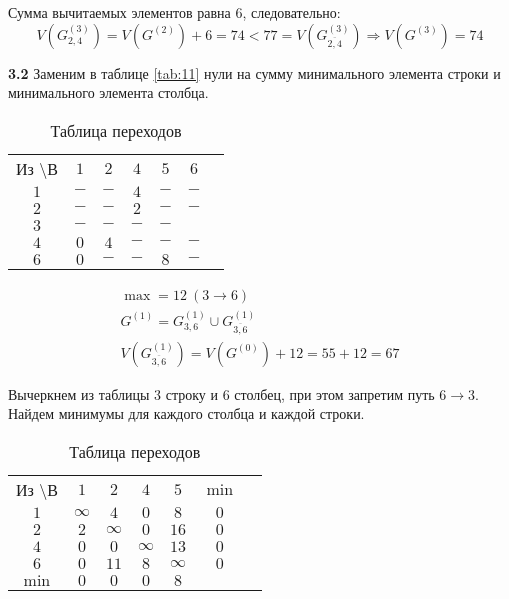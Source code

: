 Сумма вычитаемых элементов равна $6$, следовательно:
\begin{equation*}
V(G_{2,4}^{(3)}) = V(G^{(2)}) + 6 = 74 < 77 = V(G_{\overline{2,4}}^{(3)}) \Rightarrow V(G^{(3)}) = 74
\end{equation*}


\textbf{3.2} Заменим в таблице \ref{tab:11} нули на сумму минимального элемента строки и минимального элемента столбца.

\begin{table}[H]
\begin{center}
	\def\tabcolsep{15pt}
	\caption{Таблица переходов}
	\label{tab:8}
	\begin{tabular}{|c||c|c|c|c|c|c|}
		\hline
		Из \textbackslash В & $1$ & $2$ & $4$ & $5$ & $6$ \\
		\hhline{|=#=|=|=|=|=|}
		$1$ & $-$ & $-$ & $4$ & $-$ & $-$ \\
		\hline
		$2$ & $-$ & $-$ & $2$ & $-$ & $-$ \\
		\hline
		$3$ & $-$ & $-$ & $-$ & $-$ & \redbold{$12$} \\ 
		\hline
		$4$ & $0$ & $4$ & $-$ & $-$ & $-$ \\
		\hline
		$6$ & $0$ & $-$ & $-$ & $8$ & $-$ \\
		\hline
	\end{tabular}
\end{center}
\end{table}

\begin{gather*}
\max = 12\ (3 \rightarrow 6) \\
G^{(1)} = G_{3,6}^{(1)} \cup G_{\overline{3,6}}^{(1)} \\
V(G_{\overline{3,6}}^{(1)}) = V(G^{(0)}) + 12 = 55 + 12 = 67
\end{gather*}

Вычеркнем из таблицы $3$ строку и $6$ столбец, при этом запретим путь $6 \rightarrow 3$. Найдем минимумы для каждого столбца и каждой строки.

\begin{table}[H]
\begin{center}
	\def\tabcolsep{15pt}
	\caption{Таблица переходов}
	\label{tab:9}
	\begin{tabular}{|c||c|c|c|c|c|c|}
		\hline
		Из \textbackslash В & $1$ & $2$ & $4$ & $5$ & $\min$ \\
		\hhline{|=#=|=|=|=|=|}
		$1$ & $\infty$ & $4$ & $0$ & $8$ & $0$ \\
		\hline
		$2$ & $2$ & $\infty$ & $0$ & $16$ & $0$ \\
		\hline
		$4$ & $0$ & $0$ & $\infty$ & $13$ & $0$ \\
		\hline
		$6$ & $0$ & $11$ & $8$ & $\infty$ & $0$ \\
		\hhline{|=#=|=|=|=|=|}
		$\min$ & $0$ & $0$ & $0$ & $8$ & \\ 
		\hline
	\end{tabular}
\end{center}
\end{table}

